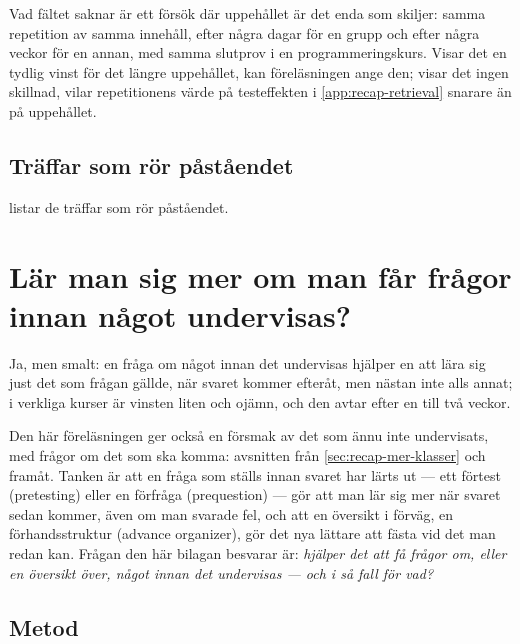 Vad fältet saknar är ett försök där uppehållet är det enda som skiljer:
samma repetition av samma innehåll, efter några dagar för en grupp och
efter några veckor för en annan, med samma slutprov i en
programmeringskurs.  Visar det en tydlig vinst för det längre
uppehållet, kan föreläsningen ange den; visar det ingen skillnad,
vilar repetitionens värde på testeffekten i \cref{app:recap-retrieval}
snarare än på uppehållet.

\section{Träffar som rör påståendet}

 listar de träffar som rör påståendet.




\chapter{Lär man sig mer om man får frågor innan något undervisas?}
\label{app:recap-pretest}

Ja, men smalt: en fråga om något innan det undervisas hjälper en att lära
sig just det som frågan gällde, när svaret kommer efteråt, men nästan
inte alls annat; i verkliga kurser är vinsten liten och ojämn, och den
avtar efter en till två veckor.

Den här föreläsningen ger också en försmak av det som ännu inte
undervisats, med frågor om det som ska komma: avsnitten från
\cref{sec:recap-mer-klasser} och framåt.
Tanken är att en fråga som ställs innan svaret har lärts ut --- ett
förtest (\foreignlanguage{english}{pretesting}) eller en förfråga
(\foreignlanguage{english}{prequestion}) --- gör att man lär sig mer när
svaret sedan kommer, även om man svarade fel\autocite{Richland2009Pretesting},
och att en översikt i förväg, en förhandsstruktur
(\foreignlanguage{english}{advance organizer}), gör det nya lättare att
fästa vid det man redan kan\autocite{Luiten1980Organizers}.  Frågan den
här bilagan besvarar är: \emph{hjälper det att få frågor om, eller en
översikt över, något innan det undervisas --- och i så fall för vad?}

\section{Metod}
\label{sec:recap-pretest-metod}

